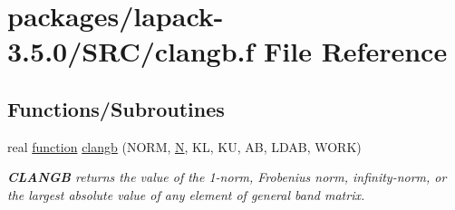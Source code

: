 \hypertarget{clangb_8f}{}\section{packages/lapack-\/3.5.0/\+S\+R\+C/clangb.f File Reference}
\label{clangb_8f}
\subsection*{Functions/\+Subroutines}
\begin{DoxyCompactItemize}
\item 
real \hyperlink{afunc_8m_a7b5e596df91eadea6c537c0825e894a7}{function} \hyperlink{group__complexGBauxiliary_ga8bbfc1becb94399a6c92c37c94972587}{clangb} (N\+O\+R\+M, \hyperlink{polmisc_8c_a0240ac851181b84ac374872dc5434ee4}{N}, K\+L, K\+U, A\+B, L\+D\+A\+B, W\+O\+R\+K)
\begin{DoxyCompactList}\small\item\em {\bfseries C\+L\+A\+N\+G\+B} returns the value of the 1-\/norm, Frobenius norm, infinity-\/norm, or the largest absolute value of any element of general band matrix. \end{DoxyCompactList}\end{DoxyCompactItemize}
